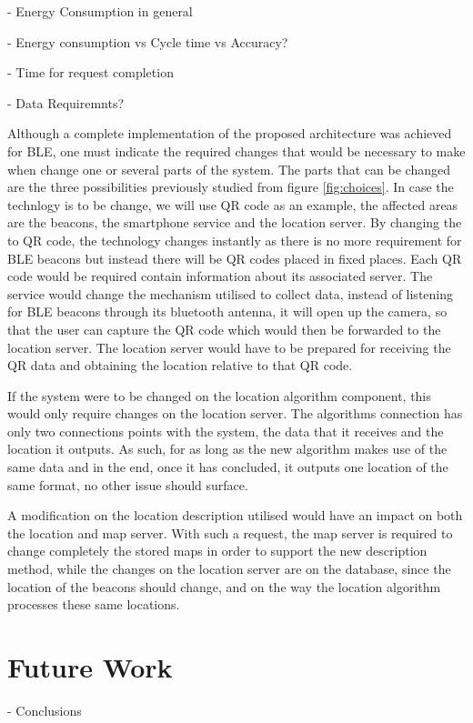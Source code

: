 \documentclass[a4paper]{IEEEtran}
\begin{document}

- Energy Consumption in general

- Energy consumption vs Cycle time vs Accuracy?

- Time for request completion

- Data Requiremnts?
 


Although a complete implementation of the proposed architecture was achieved for BLE, one must indicate the required changes that would be necessary to make when change one or several parts of the system. The parts that can be changed are the three possibilities previously studied from figure \ref{fig:choices}. In case the technlogy is to be change, we will use QR code as an example, the affected areas are the beacons, the smartphone service and the location server. By changing the to QR code, the technology changes instantly as there is no more requirement for BLE beacons but instead there will be QR codes placed in fixed places. Each QR code would be required contain information about its associated server. The service would change the mechanism utilised to collect data, instead of listening for BLE beacons through its bluetooth antenna, it will open up the camera, so that the user can capture the QR code which would then be forwarded to the location server. The location server would have to be prepared for receiving the QR data and obtaining the location relative to that QR code.

If the system were to be changed on the location algorithm component, this would only require changes on the location server. The algorithms connection has only two connections points with the system, the data that it receives and the location it outputs. As such, for as long as the new algorithm makes use of the same data and in the end, once it has concluded, it outputs one location of the same format, no other issue should surface.

A modification on the location description utilised would have an impact on both the location and map server. With such a request, the map server is required to change completely the stored maps in order to support the new description method, while the changes on the location server are on the database, since the location of the beacons should change, and on the way the location algorithm processes these same locations.  

\section{Future Work}
\label{sec:future}

- Conclusions





\end{document}
